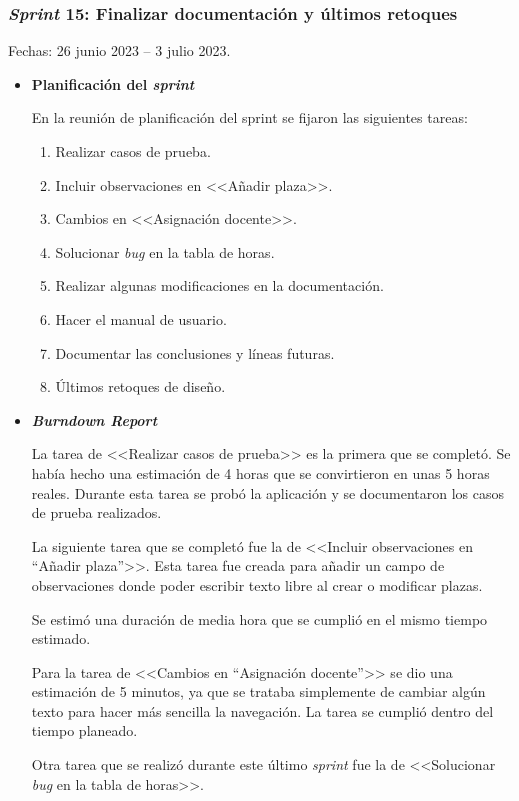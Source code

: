 \subsubsection{\textit{Sprint} 15: Finalizar documentación y últimos retoques}
Fechas: 26 junio 2023 -- 3 julio 2023.
\begin{itemize}
\item\textbf{Planificación del \textit{sprint}}

En la reunión de planificación del sprint se fijaron las siguientes tareas:
\begin{enumerate}
		\item Realizar casos de prueba.
		\item Incluir observaciones en <<Añadir plaza>>.
		\item Cambios en <<Asignación docente>>.
		\item Solucionar \textit{bug} en la tabla de horas.
		\item Realizar algunas modificaciones en la documentación.
		\item Hacer el manual de usuario.
		\item Documentar las conclusiones y líneas futuras.
		\item Últimos retoques de diseño.
\end{enumerate}

\item\textbf{\textit{Burndown Report}}

La tarea de <<Realizar casos de prueba>> es la primera que se completó.
Se había hecho una estimación de 4 horas que se convirtieron en unas 5 horas reales.
Durante esta tarea se probó la aplicación y se documentaron los casos de prueba realizados.

La siguiente tarea que se completó fue la de <<Incluir observaciones en ``Añadir plaza''>>.
Esta tarea fue creada para añadir un campo de observaciones donde poder escribir texto libre al crear o modificar plazas.

Se estimó una duración de media hora que se cumplió en el mismo tiempo estimado.

Para la tarea de <<Cambios en ``Asignación docente''>> se dio una estimación de 5 minutos, ya que se trataba simplemente de cambiar algún texto para hacer más sencilla la navegación.
La tarea se cumplió dentro del tiempo planeado.

Otra tarea que se realizó durante este último \textit{sprint} fue la de <<Solucionar \textit{bug} en la tabla de horas>>.


\end{itemize}
